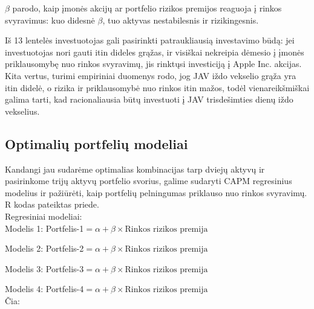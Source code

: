 \documentclass[12pt, a14paper, lithuanian]{article}
\begin{document}
$\beta$ parodo, kaip įmonės akcijų ar portfelio rizikos premijos reaguoja į rinkos svyravimus:  kuo didesnė $\beta$, tuo aktyvas nestabilesnis ir rizikingesnis. \\


\begin{comment}
\begin{figure}[H]
  \centering
\texttt{[image: kursinis-022]}

\caption{Rinkos, iždo vekselių ir įmonių $\beta$ ir ją atitinkantis grąžų vidurkis}
\end{figure}

\end{comment}

Iš 13 lentelės investuotojas gali pasirinkti patraukliausią investavimo būdą: jei investuotojas nori gauti itin dideles grąžas, ir visiškai nekreipia dėmesio į įmonės priklausomybę nuo rinkos svyravimų, jis rinktųsi investiciją į Apple Inc. akcijas. Kita vertus, turimi empiriniai duomenys rodo, jog JAV iždo vekselio grąža yra itin didelė, o rizika ir priklausomybė nuo rinkos itin mažos, todėl vienareikšmiškai galima tarti, kad racionaliausia būtų investuoti į JAV trisdešimties dienų iždo vekselius.

\pagebreak

\subsection{Optimalių portfelių modeliai}

Kandangi jau sudarėme optimalias kombinacijas tarp dviejų aktyvų ir
pasirinkome trijų aktyvų portfelio svorius, galime sudaryti CAPM regresinius modelius ir pažiūrėti, kaip portfelių pelningumas priklauso nuo rinkos svyravimų. R kodas pateiktas priede. \\

Regresiniai modeliai: \\

Modelis 1: Portfelis-1$= \alpha + \beta \times \text{Rinkos rizikos premija}$

Modelis 2: Portfelis-2$= \alpha + \beta \times \text{Rinkos rizikos premija}$

Modelis 3: Portfelis-3$= \alpha + \beta \times \text{Rinkos rizikos premija}$

Modelis 4: Portfelis-4$= \alpha + \beta \times \text{Rinkos rizikos premija}$ \\

Čia:\\
\end{document}
